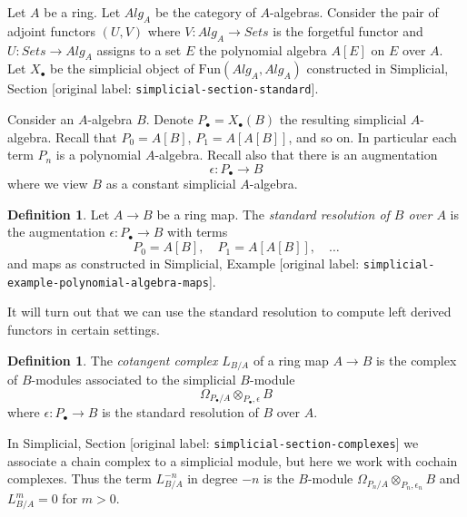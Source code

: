 \documentclass[10pt,a4paper]{article}
\theoremstyle{plain}
\theoremstyle{definition}
\newtheorem{definition}[subsection]{Definition}
\theoremstyle{remark}
\numberwithin{equation}{subsection}
\begin{document}
\noindent
Let $A$ be a ring. Let $\textit{Alg}_A$ be the category of $A$-algebras.
Consider the pair of adjoint functors $(U, V)$ where
$V : \textit{Alg}_A \to \textit{Sets}$ is the forgetful functor and
$U : \textit{Sets} \to \textit{Alg}_A$ assigns to a set $E$ the polynomial
algebra $A[E]$ on $E$ over $A$. Let $X_\bullet$ be the simplicial object of
$\text{Fun}(\textit{Alg}_A, \textit{Alg}_A)$ constructed in
Simplicial, Section \textnormal{[original label: \nolinkurl{simplicial-section-standard}]}.

\medskip\noindent
Consider an $A$-algebra $B$. Denote $P_\bullet = X_\bullet(B)$ the resulting
simplicial $A$-algebra. Recall that $P_0 = A[B]$, $P_1 = A[A[B]]$, and so on.
In particular each term $P_n$ is a polynomial $A$-algebra.
Recall also that there is an augmentation
$$
\epsilon : P_\bullet \longrightarrow B
$$
where we view $B$ as a constant simplicial $A$-algebra.

\begin{definition}
\label{definition-standard-resolution}
Let $A \to B$ be a ring map. The {\it standard resolution of $B$ over $A$}
is the augmentation $\epsilon : P_\bullet \to B$ with terms
$$
P_0 = A[B],\quad P_1 = A[A[B]],\quad \ldots
$$
and maps as constructed in
Simplicial, Example \textnormal{[original label: \nolinkurl{simplicial-example-polynomial-algebra-maps}]}.
\end{definition}

\noindent
It will turn out that we can use the standard resolution
to compute left derived functors in certain settings.

\begin{definition}
\label{definition-cotangent-complex-ring-map}
The {\it cotangent complex} $L_{B/A}$ of a ring map $A \to B$
is the complex of $B$-modules associated to the simplicial $B$-module
$$
\Omega_{P_\bullet/A} \otimes_{P_\bullet, \epsilon} B
$$
where $\epsilon : P_\bullet \to B$ is the standard resolution
of $B$ over $A$.
\end{definition}

\noindent
In Simplicial, Section \textnormal{[original label: \nolinkurl{simplicial-section-complexes}]} we associate a
chain complex to a simplicial module, but here we work with cochain complexes.
Thus the term $L_{B/A}^{-n}$ in degree $-n$ is the $B$-module
$\Omega_{P_n/A} \otimes_{P_n, \epsilon_n} B$ and $L_{B/A}^m = 0$
for $m > 0$.
\end{document}
